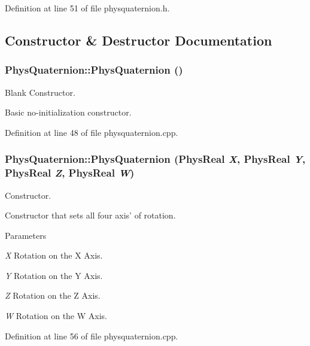 Definition at line 51 of file physquaternion.h.



\subsection{Constructor \& Destructor Documentation}
\hypertarget{classPhysQuaternion_afa90934d42b3a55d4b06bcf4c076123b}{
\subsubsection[{PhysQuaternion}]{\setlength{\rightskip}{0pt plus 5cm}PhysQuaternion::PhysQuaternion ()}}
\label{d5/d19/classPhysQuaternion_afa90934d42b3a55d4b06bcf4c076123b}


Blank Constructor. 

Basic no-\/initialization constructor. 

Definition at line 48 of file physquaternion.cpp.

\hypertarget{classPhysQuaternion_aa0cbd53e7a9e624a3f0f22aa94618e17}{
\subsubsection[{PhysQuaternion}]{\setlength{\rightskip}{0pt plus 5cm}PhysQuaternion::PhysQuaternion (PhysReal {\em X}, \/  PhysReal {\em Y}, \/  PhysReal {\em Z}, \/  PhysReal {\em W})}}
\label{d5/d19/classPhysQuaternion_aa0cbd53e7a9e624a3f0f22aa94618e17}


Constructor. 

Constructor that sets all four axis' of rotation. 
\begin{DoxyParams}{Parameters}
\item[{\em X}]Rotation on the X Axis. \item[{\em Y}]Rotation on the Y Axis. \item[{\em Z}]Rotation on the Z Axis. \item[{\em W}]Rotation on the W Axis. \end{DoxyParams}


Definition at line 56 of file physquaternion.cpp.



